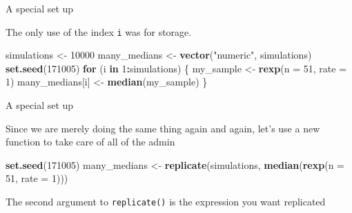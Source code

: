 \documentclass[ignorenonframetext,]{beamer}
\newenvironment{Shaded}{\begin{snugshade}}{\end{snugshade}}
\newcommand{\ControlFlowTok}[1]{\textcolor[rgb]{0.13,0.29,0.53}{\textbf{#1}}}
\newcommand{\DataTypeTok}[1]{\textcolor[rgb]{0.13,0.29,0.53}{#1}}
\newcommand{\DecValTok}[1]{\textcolor[rgb]{0.00,0.00,0.81}{#1}}
\newcommand{\KeywordTok}[1]{\textcolor[rgb]{0.13,0.29,0.53}{\textbf{#1}}}
\newcommand{\NormalTok}[1]{#1}
\newcommand{\OperatorTok}[1]{\textcolor[rgb]{0.81,0.36,0.00}{\textbf{#1}}}
\newcommand{\StringTok}[1]{\textcolor[rgb]{0.31,0.60,0.02}{#1}}
\begin{document}
\begin{frame}[fragile]{A special set up}
\protect\hypertarget{a-special-set-up}{}

The only use of the index \texttt{i} was for storage.

\begin{Shaded}
\begin{Highlighting}[]
\NormalTok{simulations <-}\StringTok{ }\DecValTok{10000}
\NormalTok{many_medians <-}\StringTok{ }\KeywordTok{vector}\NormalTok{(}\StringTok{"numeric"}\NormalTok{, simulations)}
\KeywordTok{set.seed}\NormalTok{(}\DecValTok{171005}\NormalTok{)}
\ControlFlowTok{for}\NormalTok{ (i }\ControlFlowTok{in} \DecValTok{1}\OperatorTok{:}\NormalTok{simulations) \{}
\NormalTok{  my_sample <-}\StringTok{ }\KeywordTok{rexp}\NormalTok{(}\DataTypeTok{n =} \DecValTok{51}\NormalTok{, }\DataTypeTok{rate =} \DecValTok{1}\NormalTok{)}
\NormalTok{  many_medians[i] <-}\StringTok{ }\KeywordTok{median}\NormalTok{(my_sample)}
\NormalTok{\}}
\end{Highlighting}
\end{Shaded}

\end{frame}

\begin{frame}[fragile]{A special set up}
\protect\hypertarget{a-special-set-up-1}{}

Since we are merely doing the same thing again and again, let's use a
new function to take care of all of the admin

\begin{Shaded}
\begin{Highlighting}[]
\KeywordTok{set.seed}\NormalTok{(}\DecValTok{171005}\NormalTok{)}
\NormalTok{many_medians <-}\StringTok{ }\KeywordTok{replicate}\NormalTok{(simulations,}
                          \KeywordTok{median}\NormalTok{(}\KeywordTok{rexp}\NormalTok{(}\DataTypeTok{n =} \DecValTok{51}\NormalTok{, }\DataTypeTok{rate =} \DecValTok{1}\NormalTok{)))}
\end{Highlighting}
\end{Shaded}

The second argument to \texttt{replicate()} is the expression you want
replicated

\end{frame}
\end{document}
